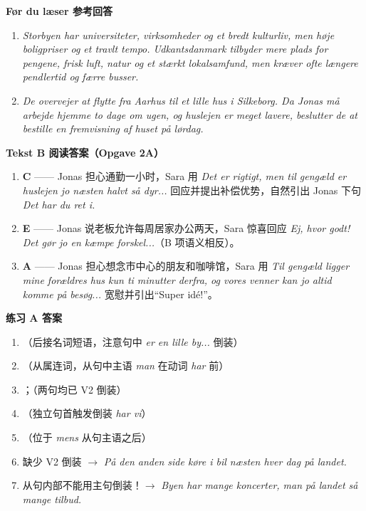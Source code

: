 \begin{answerbox}
\textbf{Før du læser 参考回答}
\begin{enumerate}
  \item \textit{Storbyen har universiteter, virksomheder og et bredt kulturliv, men høje boligpriser og et travlt tempo. Udkantsdanmark tilbyder mere plads for pengene, frisk luft, natur og et stærkt lokalsamfund, men kræver ofte længere pendlertid og færre busser.}
  \item \textit{De overvejer at flytte fra Aarhus til et lille hus i Silkeborg. Da Jonas må arbejde hjemme to dage om ugen, og huslejen er meget lavere, beslutter de at bestille en fremvisning af huset på lørdag.}
\end{enumerate}

\textbf{Tekst B 阅读答案（Opgave 2A）}
\begin{enumerate}
  \item[(1)] \textbf{C} —— Jonas 担心通勤一小时，Sara 用 \textit{Det er rigtigt, men til gengæld er huslejen jo næsten halvt så dyr...} 回应并提出补偿优势，自然引出 Jonas 下句 \textit{Det har du ret i.}
  \item[(2)] \textbf{E} —— Jonas 说老板允许每周居家办公两天，Sara 惊喜回应 \textit{Ej, hvor godt! Det gør jo en kæmpe forskel...}（B 项语义相反）。
  \item[(3)] \textbf{A} —— Jonas 担心想念市中心的朋友和咖啡馆，Sara 用 \textit{Til gengæld ligger mine forældres hus kun ti minutter derfra, og vores venner kan jo altid komme på besøg...} 宽慰并引出“Super idé!”。
\end{enumerate}

\textbf{练习 A 答案}
\begin{enumerate}
  \item {}（后接名词短语，注意句中 \textit{er en lille by...} 倒装）
  \item {}（从属连词，从句中主语 \textit{man} 在动词 \textit{har} 前）
  \item {}；（两句均已 V2 倒装）
  \item {}（独立句首触发倒装 \textit{har vi}）
  \item {}（位于 \textit{mens} 从句主语之后）
  \item 缺少 V2 倒装 $\rightarrow$ \textit{På den anden side  køre i bil næsten hver dag på landet.}
  \item 从句内部不能用主句倒装！$\rightarrow$ \textit{Byen har mange koncerter,  man på landet  så mange tilbud.}
\end{enumerate}


\end{answerbox}
